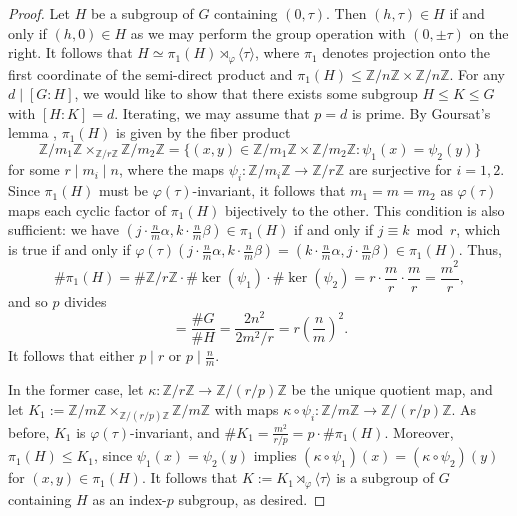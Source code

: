 \documentclass[table,dvipsnames]{amsart}
\newcommand{\Z}{\mathbb{Z}}
\newcommand{\angles}[1]{\langle #1\rangle}
\numberwithin{equation}{section}
\begin{document}
\begin{proof}
Let $H$ be a subgroup of $G$ containing $(0,\tau)$. Then $(h,\tau)\in H$ if and only if $(h,0)\in H$ as we may perform the group operation with $(0,\pm\tau)$ on the right. It follows that $H\simeq\pi_1(H)\rtimes_\varphi\angles{\tau}$, where $\pi_1$ denotes projection onto the first coordinate of the semi-direct product and $\pi_1(H)\le\Z/n\Z\times\Z/n\Z$. For any $d\mid [G:H]$, we would like to show that there exists some subgroup $H\le K\le G$ with $[H:K]=d$. Iterating, we may assume that $p=d$ is prime. By Goursat's lemma \cite[Thm.~4]{anderson}, $\pi_1(H)$ is given by the fiber product
\begin{equation*}
\Z/m_1\Z\times_{\Z/r\Z}\Z/m_2\Z=\{(x,y)\in\Z/m_1\Z\times\Z/m_2\Z:\psi_1(x)=\psi_2(y)\}
\end{equation*}
for some $r\mid m_i\mid n$, where the maps $\psi_i\colon\Z/m_i\Z\to\Z/r\Z$ are surjective for $i=1,2$. Since $\pi_1(H)$ must be $\varphi(\tau)$-invariant, it follows that $m_1=m=m_2$ as $\varphi(\tau)$ maps each cyclic factor of $\pi_1(H)$ bijectively to the other. This condition is also sufficient: we have $(j\cdot\frac{n}{m}\alpha,k\cdot\frac{n}{m}\beta)\in\pi_1(H)$ if and only if $j\equiv k\bmod{r}$, which is true if and only if $\varphi(\tau)(j\cdot\frac{n}{m}\alpha,k\cdot\frac{n}{m}\beta)=(k\cdot\frac{n}{m}\alpha,j\cdot\frac{n}{m}\beta)\in\pi_1(H)$. Thus,
\begin{equation*}
\#\pi_1(H)=\#\Z/r\Z\cdot\#\ker(\psi_1)\cdot\#\ker(\psi_2)=r\cdot\frac{m}{r}\cdot\frac{m}{r}=\frac{m^2}{r},
\end{equation*}
and so $p$ divides
\begin{equation*}
[G:H]=\frac{\#G}{\#H}=\frac{2n^2}{2m^2/r}=r\left(\frac{n}{m}\right)^2.
\end{equation*}
It follows that either $p\mid r$ or $p\mid \frac{n}{m}$.

In the former case, let $\kappa\colon\Z/r\Z\to\Z/(r/p)\Z$ be the unique quotient map, and let $K_1:=\Z/m\Z\times_{\Z/(r/p)\Z}\Z/m\Z$ with maps $\kappa\circ\psi_i\colon\Z/m\Z\to\Z/(r/p)\Z$. As before, $K_1$ is $\varphi(\tau)$-invariant, and $\#K_1=\frac{m^2}{r/p}=p\cdot\#\pi_1(H)$. Moreover, $\pi_1(H)\le K_1$, since $\psi_1(x)=\psi_2(y)$ implies $(\kappa\circ\psi_1)(x)=(\kappa\circ\psi_2)(y)$ for $(x,y)\in\pi_1(H)$. It follows that $K:=K_1\rtimes_\varphi\angles{\tau}$ is a subgroup of $G$ containing $H$ as an index-$p$ subgroup, as desired.


\end{proof}
\end{document}

